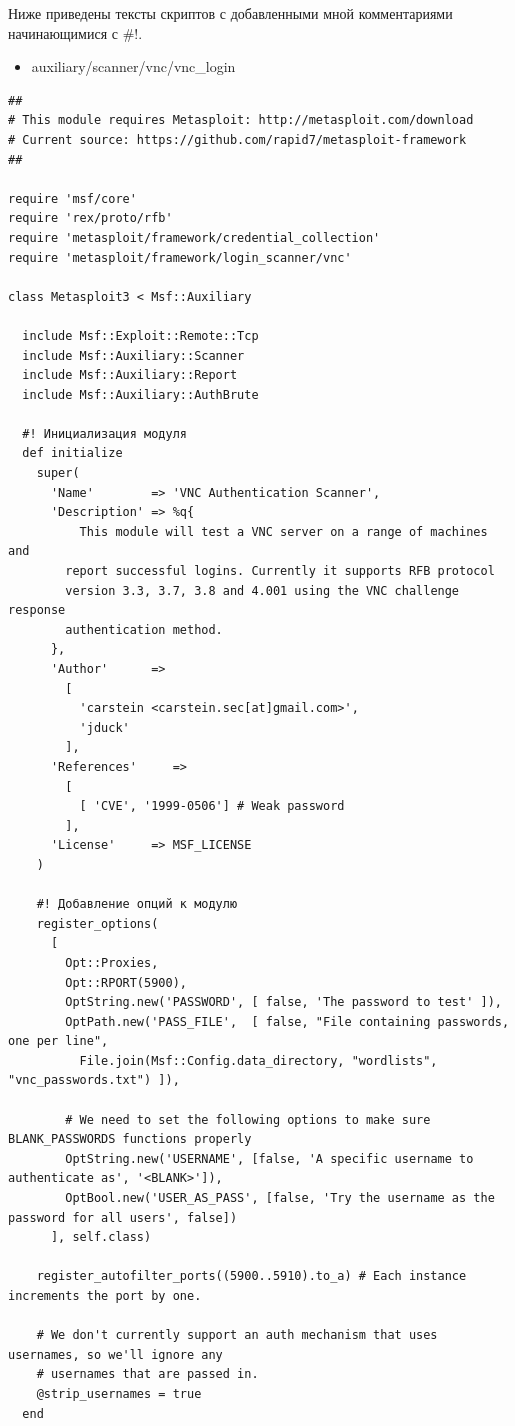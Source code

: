 \documentclass[10pt,a4paper,titlepage]{article}
\begin{document}
Ниже приведены тексты скриптов с добавленными мной комментариями начинающимися с \#!.
\begin{itemize}
	\item auxiliary/scanner/vnc/vnc\_login
\end{itemize}
\begin{verbatim}
##
# This module requires Metasploit: http://metasploit.com/download
# Current source: https://github.com/rapid7/metasploit-framework
##

require 'msf/core'
require 'rex/proto/rfb'
require 'metasploit/framework/credential_collection'
require 'metasploit/framework/login_scanner/vnc'

class Metasploit3 < Msf::Auxiliary

  include Msf::Exploit::Remote::Tcp
  include Msf::Auxiliary::Scanner
  include Msf::Auxiliary::Report
  include Msf::Auxiliary::AuthBrute

  #! Инициализация модуля
  def initialize
    super(
      'Name'        => 'VNC Authentication Scanner',
      'Description' => %q{
          This module will test a VNC server on a range of machines and
        report successful logins. Currently it supports RFB protocol
        version 3.3, 3.7, 3.8 and 4.001 using the VNC challenge response
        authentication method.
      },
      'Author'      =>
        [
          'carstein <carstein.sec[at]gmail.com>',
          'jduck'
        ],
      'References'     =>
        [
          [ 'CVE', '1999-0506'] # Weak password
        ],
      'License'     => MSF_LICENSE
    )

    #! Добавление опций к модулю
    register_options(
      [
        Opt::Proxies,
        Opt::RPORT(5900),
        OptString.new('PASSWORD', [ false, 'The password to test' ]),
        OptPath.new('PASS_FILE',  [ false, "File containing passwords, one per line",
          File.join(Msf::Config.data_directory, "wordlists", "vnc_passwords.txt") ]),

        # We need to set the following options to make sure BLANK_PASSWORDS functions properly
        OptString.new('USERNAME', [false, 'A specific username to authenticate as', '<BLANK>']),
        OptBool.new('USER_AS_PASS', [false, 'Try the username as the password for all users', false])
      ], self.class)

    register_autofilter_ports((5900..5910).to_a) # Each instance increments the port by one.

    # We don't currently support an auth mechanism that uses usernames, so we'll ignore any
    # usernames that are passed in.
    @strip_usernames = true
  end


\end{verbatim}
\end{document}
